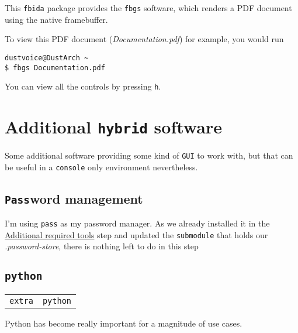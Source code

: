 \documentclass[9pt]{report}
\newenvironment{NOTE}
{\begin{tcolorbox}[colback=admonitionBG,coltitle=draculaFG,colframe=draculaBlue,colbacktitle=draculaBlue,title=NOTE]}
{\end{tcolorbox}}
\newenvironment{packagetable}
{\begin{longtabu}to \textwidth [b]{X[1,r]|X[1,l]}}
{\end{longtabu}}
\begin{document}
This \texttt{fbida} package provides the \texttt{fbgs} software, which renders a PDF document using the native framebuffer.


To view this PDF document (\textit{Documentation.pdf}) for example, you would run


\begin{verbatim}
dustvoice@DustArch ~
$ fbgs Documentation.pdf
\end{verbatim}

\begin{NOTE}
    You can view all the controls by pressing \texttt{h}.

\end{NOTE}

\newpage

\hypertarget{x-additional-hybrid-software}{\section{Additional \texttt{hybrid} software}}
Some additional software providing some kind of \texttt{GUI} to work with, but that can be useful in a \texttt{console} only environment nevertheless.



\newpage

\hypertarget{x-password-management}{\subsection{\texttt{Pass}word management}}
I’m using \texttt{pass} as my password manager.
As we already installed it in the \hyperlink{x-additional-tools-setup-home}{Additional required tools} step and updated the \texttt{submodule} that holds our \textit{.password-store}, there is nothing left to do in this step



\newpage

\hypertarget{x-python}{\subsection{\texttt{python}}}
\begin{packagetable}
    \texttt{extra} & \texttt{python} \\ 
\end{packagetable}

Python has become really important for a magnitude of use cases.



\newpage
\end{document}
